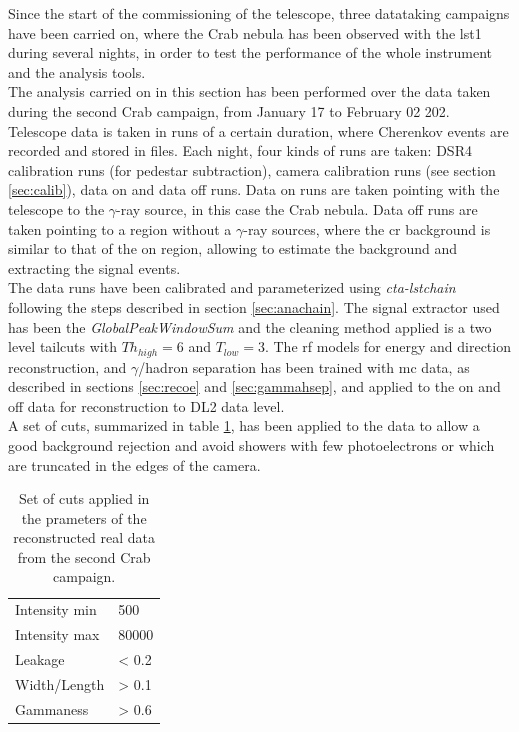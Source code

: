 \documentclass[main.tex]{subfiles}
\begin{document}
Since the start of the commissioning of the telescope, three datataking campaigns have been carried on, where the Crab nebula has been observed with the \gls{lst}1 during several nights, in order to test the performance of the whole instrument and the analysis tools.\\
The analysis carried on in this section has been performed over the data taken during the second Crab campaign, from January 17 to February 02 202. Telescope data is taken in runs of a certain duration, where Cherenkov events are recorded and stored in files. Each night, four kinds of runs are taken: DSR4 calibration runs (for pedestar subtraction), camera calibration runs (see section \ref{sec:calib}), data on and data off runs. Data on runs are taken pointing with the telescope to the $\gamma$-ray source, in this case the Crab nebula. Data off runs are taken pointing to a region without a $\gamma$-ray sources, where the \gls{cr} background is similar to that of the on region, allowing to estimate the background and extracting the signal events.\\
The data runs have been calibrated and parameterized using \textit{cta-lstchain} following the steps described in section \ref{sec:anachain}. The signal extractor used has been the \textit{GlobalPeakWindowSum}  and the cleaning method applied is a two level tailcuts with $Th_{high}=6$ and $T_{low}=3$. The \gls{rf} models for energy and direction reconstruction, and $\gamma$/hadron separation has been trained with \gls{mc} data, as described in sections \ref{sec:recoe} and \ref{sec:gammahsep}, and applied to the on and off data for reconstruction to DL2 data level.\\
A set of cuts, summarized in table \ref{tab:cuts}, has been applied to the data to allow a good background rejection and avoid showers with few photoelectrons or which are truncated in the edges of the camera.

\begin{table}
  \centering
    \begin{tabular}{|l|l|}
      \hline
      Intensity min & 500  \\
      Intensity max & 80000 \\
      Leakage       & < 0.2 \\
      Width/Length  & > 0.1 \\
      Gammaness     & > 0.6 \\
      \hline
      \end{tabular}
  \caption{Set of cuts applied in the prameters of the reconstructed real data from the second Crab campaign.}\label{tab:cuts}
\end{table}
\end{document}
